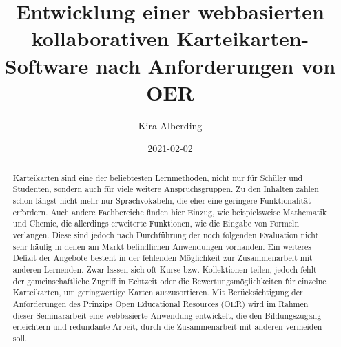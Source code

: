 \documentclass[
    disabletodonotes,         %
    language=german           %
  ]{dbisseminar}
\author{%
  Kira Alberding \email{k{\_}albe09@uni-muenster.de} %
}
\title{Entwicklung einer webbasierten kollaborativen Karteikarten-Software nach Anforderungen von OER}
\date{2021-02-02}
\begin{document}
  \maketitle

  \frontmatter


  \begin{abstract}
Karteikarten sind eine der beliebtesten Lernmethoden, nicht nur für Schüler und Studenten, sondern auch für viele weitere Anspruchsgruppen. Zu den Inhalten zählen schon längst nicht mehr nur Sprachvokabeln, die eher eine geringere Funktionalität erfordern. Auch andere Fachbereiche finden hier Einzug, wie beispielsweise Mathematik und Chemie, die allerdings erweiterte Funktionen, wie die Eingabe von Formeln verlangen. Diese sind jedoch nach Durchführung der noch folgenden Evaluation nicht sehr häufig in denen am Markt befindlichen Anwendungen vorhanden. Ein weiteres Defizit der Angebote besteht in der fehlenden Möglichkeit zur Zusammenarbeit mit anderen Lernenden. Zwar lassen sich oft Kurse bzw. Kollektionen teilen, jedoch fehlt der gemeinschaftliche Zugriff in Echtzeit oder die Bewertungsmöglichkeiten für einzelne Karteikarten, um geringwertige Karten auszusortieren. Mit Berücksichtigung der Anforderungen des Prinzips Open Educational Resources (OER) wird im Rahmen dieser Seminararbeit eine webbasierte Anwendung entwickelt, die den Bildungszugang erleichtern und redundante Arbeit, durch die Zusammenarbeit mit anderen vermeiden soll.
  \end{abstract}

  \tableofcontents
  \pagestyle{plain}
  \newpage
  \pagestyle{plain}

  \listofabbreviations
  \glsaddall
  \listofsymbols


  \mainmatter
  



  \newpage
\end{document}
